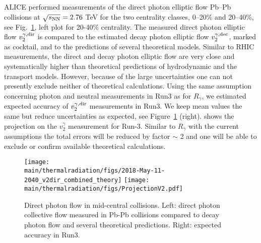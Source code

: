 ALICE performed measurements of the direct photon elliptic flow \cite{Acharya:2018bdy} Pb--Pb collisions at $\sqrt{s_{\rm NN}}=2.76$ TeV for the two centrality classes, 0--20\% and 20--40\%, see Fig.~\ref{fig:RealPhotonsV2dir}, left plot for 20-40\% centrality.
The measured direct photon elliptic flow $v_2^{\gamma,\rm dir}$ is compared to the estimated decay photon elliptic flow $v_2^{\gamma,\rm dec}$, marked as cocktail, and to the predictions of several theoretical models. Similar to RHIC measurements, the direct and decay photon elliptic flow are very close and systematically higher than theoretical predictions of hydrodynamic  \cite{Gale:2014dfa,Chatterjee:2017akg} and the transport  \cite{Linnyk:2015tha} models. However, because of the large uncertainties  one can not presently exclude neither of theoretical calculations. Using the same assumption concerning photon and neutral measurements in Run3 as for $R_\gamma$, we estimated expected accuracy of  $v_2^{\gamma,\rm dir}$ measurements in Run3. We keep mean values the same but reduce uncertainties as expected, see Figure~\ref{fig:RealPhotonsV2dir} (right). shows the projection on the $v_2^\gamma$ measurement 
for Run-3. Similar to $R_\gamma$ with the current assumptions the total errors will be reduced by factor $\sim$ 2 and one will be able to exclude or confirm available theoretical calculations.

\begin{figure}[htb]
\centering
\texttt{[image: \\main/thermalradiation/figs/2018-May-11-2040\_v2dir\_combined\_theory]}
\texttt{[image: \\main/thermalradiation/figs/ProjectionV2.pdf]}
\caption{Direct photon flow in mid-central collisions. Left: direct photon collective flow measured in Pb-Pb collisions compared to decay photon flow and several theoretical predictions. Right: expected accuracy in Run3. }
\label{fig:RealPhotonsV2dir}
\end{figure}




